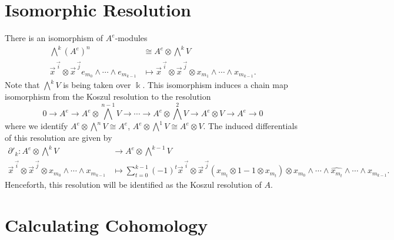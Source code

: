 \documentclass[12pt,a4paper]{article}
\newcommand{\kk}{\Bbbk}
\newcommand\1{_{(1)}}
\newcommand\2{_{(2)}}
\begin{document}
\section{Isomorphic Resolution}

There is an isomorphism of $A^e$-modules 
\begin{align*}
\bigwedge^k\left(A^e\right)^n&\cong A^e\otimes\bigwedge^k V  \\
 \vec{x}^{\,\vec{i}}\otimes\vec{x}^{\,\vec{j}}e_{m_0}\wedge\cdots\wedge e_{m_{k-1}}&\mapsto \vec{x}^{\,\vec{i}}\otimes\vec{x}^{\,\vec{j}}\otimes x_{m_1}\wedge\cdots\wedge x_{m_{k-1}}.
\end{align*}
 Note that $\bigwedge^k V$ is being taken over $\kk$.
This isomorphism induces a chain map isomorphism from the Koszul resolution to the resolution
\[
0\to A^e\to A^e\otimes \bigwedge^{n-1}V\to\cdots\to A^e\otimes\bigwedge^2 V\to A^e\otimes V\to A^e\to 0  
\]
where we identify $A^e\otimes \bigwedge^n V\cong A^e$, $A^e\otimes\bigwedge^1 V\cong A^e\otimes V$.
The induced differentials of this resolution are given by
\begin{align*}
  \partial'_k:A^e\otimes\bigwedge^k V&\to A^e\otimes\bigwedge^{k-1}V\\
  \vec{x}^{\,\vec{i}}\otimes\vec{x}^{\,\vec{j}}\otimes x_{m_0}\wedge\cdots\wedge x_{m_{k-1}}&\mapsto \sum_{t=0}^{k-1}(-1)^t\vec{x}^{\,\vec{i}}\otimes\vec{x}^{\,\vec{j}}(x_{m_t}\otimes1-1\otimes x_{m_t})\otimes x_{m_0}\wedge\cdots\wedge\widehat{x_{m_t}}\wedge\cdots\wedge x_{m_{k-1}}.
\end{align*}
Henceforth, this resolution will be identified as the Koszul resolution of $A$.

\section{Calculating Cohomology}
\end{document}
